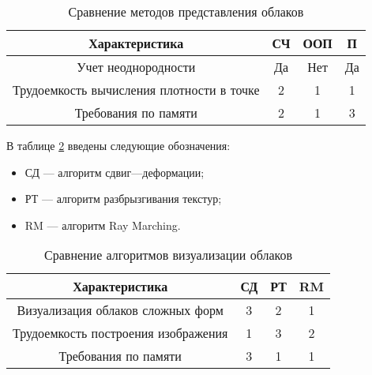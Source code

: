 \begin{table}[h]
	\begin{center}
		\begin{threeparttable}
			\captionsetup{justification=raggedright,singlelinecheck=off}
			\caption{Сравнение методов представления облаков}
			\label{tbl:repr_choice}
			\begin{tabular}{|c|c|c|c|}
				\hline
				Характеристика &  СЧ  & ООП & П \\
				\hline
				Учет неоднородности &  Да  & Нет & Да \\
				\hline
				Трудоемкость вычисления плотности в точке &  2  & 1 & 1 \\
				\hline
				Требования по памяти & 2 & 1 & 3 \\
				\hline
			\end{tabular}
		\end{threeparttable}
	\end{center}
\end{table}


В таблице \ref{tbl:rend_choice} введены следующие обозначения:
\begin{itemize}
	\item СД --- алгоритм сдвиг---деформации;
	\item РТ --- алгоритм разбрызгивания текстур;
	\item RM --- алгоритм Ray Marching.
\end{itemize} 

\begin{table}[h]
	\begin{center}
		\begin{threeparttable}
			\captionsetup{justification=raggedright,singlelinecheck=off}
			\caption{Сравнение алгоритмов визуализации облаков}
			\label{tbl:rend_choice}
			\begin{tabular}{|c|c|c|c|}
				\hline
				Характеристика &  СД  & РТ & RM \\
				\hline
				Визуализация облаков сложных форм &  3  & 2 & 1 \\
				\hline
				Трудоемкость построения изображения &  1  & 3 & 2 \\
				\hline
				Требования по памяти & 3 & 1 & 1 \\
				\hline
			\end{tabular}
		\end{threeparttable}
	\end{center}
\end{table}




